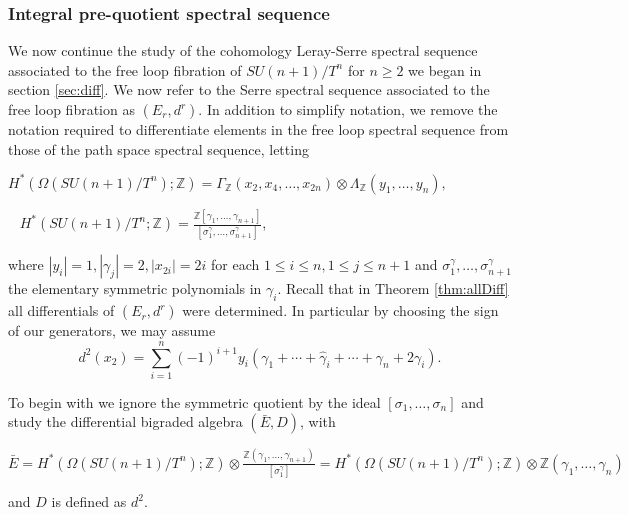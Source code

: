\documentclass{article}
\theoremstyle{plain}
\theoremstyle{definition}
\numberwithin{thm}{section}
\begin{document}
			\subsubsection{Integral pre-quotient spectral sequence}\label{sec:IntegralPre}
			
			We now continue the study of the cohomology Leray-Serre spectral sequence associated to the free loop fibration of $SU(n+1)/T^n$ for $n\geq 2$ 
			we began in section \ref{sec:diff}.
			We now refer to the Serre spectral sequence associated to the free loop fibration as $(E_r,d^r)$.
			In addition to simplify notation,
			we remove the notation required to differentiate elements in the free loop spectral sequence from those of the path space spectral sequence, letting

			\begin{center}
					$H^*(\Omega(SU(n+1)/T^n);\mathbb{Z})= \Gamma_{\mathbb{Z}}(x_2,x_4,\dots,x_{2n})\otimes\Lambda_{\mathbb{Z}}(y_1,\dots,y_{n}),$
			\end{center}
			\begin{center}
					$\;\;\; H^*(SU(n+1)/T^n;\mathbb{Z})= \frac{\mathbb{Z}[\gamma_1,\dots,\gamma_{n+1}]}{[\sigma^\gamma_1,\dots,\sigma_{n+1}^\gamma]}$,
			\end{center}
			
			where $|y_i|=1, |\gamma_j|=2, |x_{2i}|=2i$ for each $1\leq i\leq n,1\leq j\leq n+1$ and $\sigma^\gamma_1,\dots,\sigma_{n+1}^\gamma$
			the elementary symmetric polynomials in $\gamma_i$. 
			Recall that in Theorem \ref{thm:allDiff} all differentials of $(E_r,d^r)$ were determined.
			In particular by choosing the sign of our generators, we may assume
			\begin{equation}\label{eq:d^2}
				d^2(x_2)
				=\sum_{i=1}^n(-1)^{i+1}{y_i(\gamma_1+\cdots+\hat{\gamma}_i+\cdots+\gamma_n+2\gamma_i)}.
			\end{equation}
			
			To begin with we ignore the symmetric quotient by the ideal $[\sigma_1,\dots,\sigma_n]$ and study the differential bigraded algebra
			$(\bar{E},D)$, with
			\begin{center}
				$\bar{E} = H^*(\Omega(SU(n+1)/T^n);\mathbb{Z}) \otimes \frac{\mathbb{Z}(\gamma_1,\dots,\gamma_{n+1})}{[\sigma^\gamma_1]}
				= H^*(\Omega(SU(n+1)/T^n);\mathbb{Z}) \otimes \mathbb{Z}(\gamma_1,\dots,\gamma_n)$
			\end{center}
			and $D$ is defined as $d^2$. 
			
\end{document}
